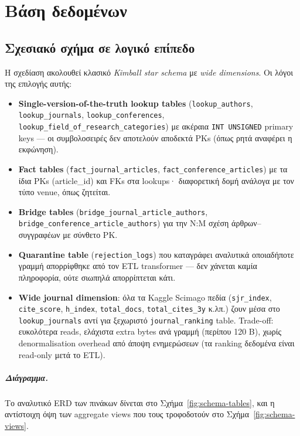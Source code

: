\chapter{Βάση δεδομένων}

\section{Σχεσιακό σχήμα σε λογικό επίπεδο}
\label{sec:schema-logical}

Η σχεδίαση ακολουθεί κλασικό \emph{Kimball star schema} με \emph{wide dimensions}.
Οι λόγοι της επιλογής αυτής:

\begin{itemize}
    \item \textbf{Single-version-of-the-truth lookup tables} (\texttt{lookup\_authors},
          \texttt{lookup\_journals}, \texttt{lookup\_conferences},
          \texttt{lookup\_field\_of\_research\_categories}) με ακέραια \texttt{INT
          UNSIGNED} primary keys --- οι συμβολοσειρές δεν αποτελούν αποδεκτά PKs
          (όπως ρητά αναφέρει η εκφώνηση).
    \item \textbf{Fact tables} (\texttt{fact\_journal\_articles},
          \texttt{fact\_conference\_articles}) με τα ίδια PKs (article\_id) και
          FKs στα lookups· διαφορετική δομή ανάλογα με τον τύπο venue, όπως ζητείται.
    \item \textbf{Bridge tables} (\texttt{bridge\_journal\_article\_authors},
          \texttt{bridge\_conference\_article\_authors}) για την N:M σχέση
          άρθρων--συγγραφέων με σύνθετο PK.
    \item \textbf{Quarantine table} (\texttt{rejection\_logs}) που καταγράφει
          αναλυτικά οποιαδήποτε γραμμή απορρίφθηκε από τον ETL transformer ---
          δεν χάνεται καμία πληροφορία, ούτε σιωπηλά απορρίπτεται κάτι.
    \item \textbf{Wide journal dimension}: όλα τα Kaggle Scimago πεδία
          (\texttt{sjr\_index}, \texttt{cite\_score}, \texttt{h\_index},
          \texttt{total\_docs}, \texttt{total\_cites\_3y} κ.λπ.) ζουν μέσα στο
          \texttt{lookup\_journals} αντί για ξεχωριστό
          \texttt{journal\_ranking} table. Trade-off: ευκολότερα reads, ελάχιστα
          extra bytes ανά γραμμή (περίπου 120 B), χωρίς denormalisation overhead από
          άποψη ενημερώσεων (τα ranking δεδομένα είναι read-only μετά το ETL).
\end{itemize}

\paragraph{Διάγραμμα.} Το αναλυτικό ERD των πινάκων δίνεται στο
Σχήμα~\ref{fig:schema-tables}, και η αντίστοιχη όψη των aggregate views
που τους τροφοδοτούν στο Σχήμα~\ref{fig:schema-views}.

